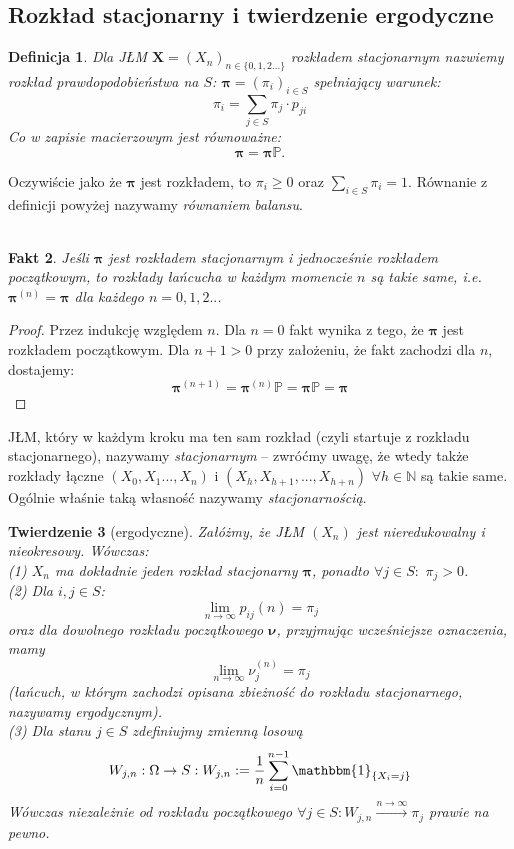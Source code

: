 \documentclass[a4paper]{article}
\theoremstyle{defn}
\newtheorem{defn}{Definicja}[subsection]
\theoremstyle{theorem}
\newtheorem{theorem}[defn]{Twierdzenie}
\theoremstyle{lemma}
\theoremstyle{cor}
\theoremstyle{fact}
\newtheorem{fact}[defn]{Fakt}
\begin{document}
\subsection{Rozkład stacjonarny i twierdzenie ergodyczne}
\label{sect2.2}
\begin{defn}\label{defn2.2.1}
Dla JŁM $\boldsymbol{X} = (X_n)_{n \in \{0,1,2...\}}$ \textit{rozkładem stacjonarnym} nazwiemy rozkład prawdopodobieństwa na $S$: $\boldsymbol{\pi} = (\pi_i)_{i \in S}$ spełniający warunek:
$$\pi_i = \sum\limits_{j \in S} \pi_j \cdot p_{ji}$$
Co w zapisie macierzowym jest równoważne:
$$\boldsymbol{\pi} = \boldsymbol{\pi} \mathbb{P}.$$
\end{defn}
Oczywiście jako że $\boldsymbol{\pi}$ jest rozkładem, to $\pi_i \geq 0$ oraz $\sum\limits_{i \in S} \pi_i = 1$. Równanie z definicji powyżej nazywamy \textit{równaniem balansu}.
\\\\
\begin{fact}\label{fact2.2.2}
Jeśli $\boldsymbol{\pi}$ jest rozkładem stacjonarnym i jednocześnie rozkładem początkowym, to rozkłady łańcucha w każdym momencie $n$ są takie same, i.e. $\boldsymbol{\pi}^{(n)} = \boldsymbol{\pi}$ dla każdego $n = 0,1,2..$.
\end{fact}
\begin{proof}
Przez indukcję względem $n$. Dla $n = 0$ fakt wynika z tego, że $\boldsymbol{\pi}$ jest rozkładem początkowym. Dla $n+1>0$ przy założeniu, że fakt zachodzi dla $n$, dostajemy:
$$\boldsymbol{\pi}^{(n+1)} = \boldsymbol{\pi}^{(n)} \mathbb{P} = \boldsymbol{\pi} \mathbb{P} = \boldsymbol{\pi}$$
\end{proof}
JŁM, który w każdym kroku ma ten sam rozkład (czyli startuje z rozkładu stacjonarnego), nazywamy \textit{stacjonarnym} – zwróćmy uwagę, że wtedy także rozkłady łączne $(X_0, X_1 ..., X_n)$ i $(X_h, X_{h+1}, ..., X_{h+n})$ $\forall h \in \mathbb{N}$ są takie same. Ogólnie właśnie taką własność nazywamy \textit{stacjonarnością}.
\\
\begin{theorem}[ergodyczne]\label{theorem2.2.3}
Załóżmy, że JŁM $(X_n)$ jest nieredukowalny i nieokresowy. Wówczas:\\
(1) $X_n$ ma dokładnie jeden rozkład stacjonarny $\boldsymbol{\pi}$, ponadto $\forall j \in S:\,\, \pi_j > 0$.
\\ 
(2) Dla $i,j \in S$: $$\lim\limits_{n \to \infty} p_{ij}(n) = \pi_j$$ oraz dla dowolnego rozkładu początkowego $\boldsymbol{\nu}$, przyjmując wcześniejsze oznaczenia, mamy $$\lim\limits_{n \to \infty} \nu_j^{(n)} = \pi_j$$ (łańcuch, w którym zachodzi opisana zbieżność do rozkładu stacjonarnego, nazywamy ergodycznym).
\\
(3) Dla stanu $j \in S$ zdefiniujmy zmienną losową $$W_{j,n}: \Omega \rightarrow S: W_{j,n} :=  \frac{1}{n} \sum\limits_{i = 0}^{n-1} \mathbbm{1}_{\{X_i = j\}}$$ 
Wówczas niezależnie od rozkładu początkowego $\forall j \in S: W_{j,n} \xrightarrow{{n \rightarrow \infty}} \pi_j$ prawie na pewno.
\end{theorem}
\end{document}
